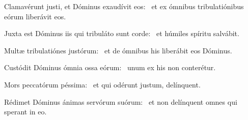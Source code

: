 \item Clamavérunt justi, et Dóminus exaudívit eos:~\psstar{} et ex ómnibus tribulatiónibus eórum liberávit eos.

\item Juxta est Dóminus iis qui tribuláto sunt corde:~\psstar{} et húmiles spíritu salvábit.

\item Multæ tribulatiónes justó\-rum:~\psstar{} et de ómnibus his liberábit eos Dóminus.

\item Custódit Dóminus ómnia ossa eórum:~\psstar{} unum ex his non conterétur.

\item Mors peccatórum péssima:~\psstar{} et qui odérunt justum, delínquent.

\item Rédimet Dóminus ánimas servórum suórum:~\psstar{} et non delínquent omnes qui sperant in eo.

